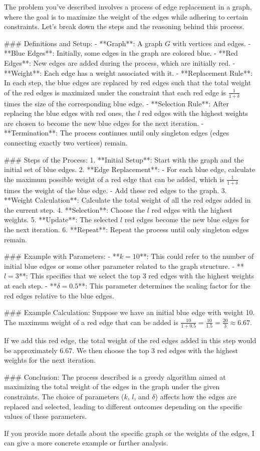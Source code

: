 The problem you've described involves a process of edge replacement in a graph, where the goal is to maximize the weight of the edges while adhering to certain constraints. Let's break down the steps and the reasoning behind this process.

### Definitions and Setup:
- **Graph**: A graph \( G \) with vertices and edges.
- **Blue Edges**: Initially, some edges in the graph are colored blue.
- **Red Edges**: New edges are added during the process, which are initially red.
- **Weight**: Each edge has a weight associated with it.
- **Replacement Rule**: In each step, the blue edges are replaced by red edges such that the total weight of the red edges is maximized under the constraint that each red edge is \(\frac{1}{1+\delta}\) times the size of the corresponding blue edge.
- **Selection Rule**: After replacing the blue edges with red ones, the \( l \) red edges with the highest weights are chosen to become the new blue edges for the next iteration.
- **Termination**: The process continues until only singleton edges (edges connecting exactly two vertices) remain.

### Steps of the Process:
1. **Initial Setup**: Start with the graph and the initial set of blue edges.
2. **Edge Replacement**:
   - For each blue edge, calculate the maximum possible weight of a red edge that can be added, which is \(\frac{1}{1+\delta}\) times the weight of the blue edge.
   - Add these red edges to the graph.
3. **Weight Calculation**: Calculate the total weight of all the red edges added in the current step.
4. **Selection**: Choose the \( l \) red edges with the highest weights.
5. **Update**: The selected \( l \) red edges become the new blue edges for the next iteration.
6. **Repeat**: Repeat the process until only singleton edges remain.

### Example with Parameters:
- **\( k = 10 \)**: This could refer to the number of initial blue edges or some other parameter related to the graph structure.
- **\( l = 3 \)**: This specifies that we select the top 3 red edges with the highest weights at each step.
- **\( \delta = 0.5 \)**: This parameter determines the scaling factor for the red edges relative to the blue edges.

### Example Calculation:
Suppose we have an initial blue edge with weight 10. The maximum weight of a red edge that can be added is \(\frac{10}{1+0.5} = \frac{10}{1.5} = \frac{20}{3} \approx 6.67\).

If we add this red edge, the total weight of the red edges added in this step would be approximately 6.67. We then choose the top 3 red edges with the highest weights for the next iteration.

### Conclusion:
The process described is a greedy algorithm aimed at maximizing the total weight of the edges in the graph under the given constraints. The choice of parameters (\( k \), \( l \), and \( \delta \)) affects how the edges are replaced and selected, leading to different outcomes depending on the specific values of these parameters.

If you provide more details about the specific graph or the weights of the edges, I can give a more concrete example or further analysis.